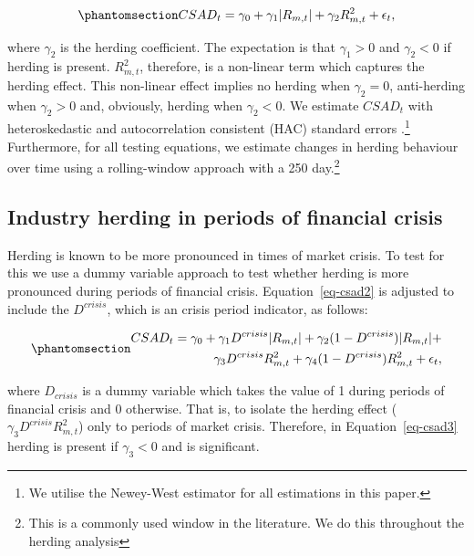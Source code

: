 \documentclass[
  letterpaper,
  DIV=11,
  numbers=noendperiod]{scrartcl}
\begin{document}
\begin{equation}\phantomsection\label{eq-csad2}{CSAD_{t} = \gamma_0 +  \gamma_1|R_{m, t}| +  \gamma_2R_{m, t}^2 + \epsilon_{t},}\end{equation}

where \(\gamma_2\) is the herding coefficient. The expectation is that
\(\gamma_1 > 0\) and \(\gamma_2 < 0\) if herding is present.
\(R_{m, t}^2\), therefore, is a non-linear term which captures the
herding effect. This non-linear effect implies no herding when
\(\gamma_2 = 0\), anti-herding when \(\gamma_2 > 0\) and, obviously,
herding when \(\gamma_2 < 0\). We estimate \(CSAD_{t}\) with
heteroskedastic and autocorrelation consistent (HAC) standard errors
\citep[See][]{newey1987simple}.\footnote{We utilise the Newey-West
  estimator for all estimations in this paper.} Furthermore, for all
testing equations, we estimate changes in herding behaviour over time
using a rolling-window approach with a 250 day.\footnote{This is a
  commonly used window in the literature. We do this throughout the
  herding analysis}

\subsection{Industry herding in periods of financial
crisis}\label{industry-herding-in-periods-of-financial-crisis}

Herding is known to be more pronounced in times of market crisis. To
test for this we use a dummy variable approach to test whether herding
is more pronounced during periods of financial crisis.
Equation~\ref{eq-csad2} is adjusted to include the \(D^{crisis}\), which
is an crisis period indicator, as follows:

\begin{equation}\phantomsection\label{eq-csad3}{
\begin{aligned}
CSAD_{t} = \gamma_0 +  \gamma_1D^{crisis}|R_{m, t}| + \gamma_2(1 - D^{crisis})|R_{m,t}| + \\  \gamma_3D^{crisis}R_{m, t}^2 + \gamma_4(1-D^{crisis})R_{m,t}^2 + \epsilon_{t},
\end{aligned}
}\end{equation}

where \(D_{crisis}\) is a dummy variable which takes the value of 1
during periods of financial crisis and 0 otherwise. That is, to isolate
the herding effect (\(\gamma_3D^{crisis}R_{m, t}^2\)) only to periods of
market crisis. Therefore, in Equation~\ref{eq-csad3} herding is present
if \(\gamma_3 < 0\) and is significant.
\end{document}
